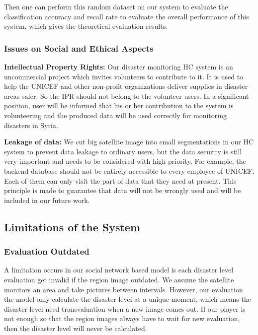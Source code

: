 Then one can perform this random dataset on our system to evaluate the classification accuracy and recall rate to
evaluate the overall performance of this system, which gives the theoretical evaluation results.

\subsubsection{Issues on Social and Ethical Aspects}

\textbf{Intellectual Property Rights:} 
Our disaster monitoring HC system is an uncommercial project which invites volunteers to contribute to it. 
It is used to help the UNICEF and other non-profit organizations deliver supplies in disaster areas safer. 
So the IPR should not belong to the volunteer users. In a significant position, user will be informed that 
his or her contribution to the system is volunteering and the produced data will be used correctly for 
monitoring disasters in Syria.

\textbf{Leakage of data:} 
We cut big satellite image into small segmentations in our HC system to prevent data leakage to ordinary users, 
but the data security is still very important and needs to be considered with high priority. For example, 
the backend database should not be entirely accessible to every employee of UNICEF. 
Each of them can only visit the part of data that they need at present. This principle is made to guarantee 
that data will not be wrongly used and will be included in our future work.

\subsection{Limitations of the System}

\subsubsection{Evaluation Outdated}

A limitation occurs in our social network based model is each disaster level evaluation get invalid 
if the region image outdated. 
We assume the satellite monitors an area and take pictures between intervals. However, our evaluation
the model only calculate the disaster level at a unique moment, which means the disaster level need 
transvaluation when a new image comes out.
If our player is not enough so that the region images always have to wait for new evaluation, then the
disaster level will never be calculated.

